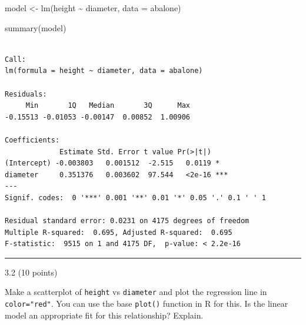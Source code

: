 \documentclass[
  letterpaper,
  DIV=11,
  numbers=noendperiod]{scrartcl}
\newenvironment{Shaded}{\begin{snugshade}}{\end{snugshade}}
\newcommand{\AttributeTok}[1]{\textcolor[rgb]{0.40,0.45,0.13}{#1}}
\newcommand{\FunctionTok}[1]{\textcolor[rgb]{0.28,0.35,0.67}{#1}}
\newcommand{\NormalTok}[1]{\textcolor[rgb]{0.00,0.23,0.31}{#1}}
\newcommand{\OtherTok}[1]{\textcolor[rgb]{0.00,0.23,0.31}{#1}}
\newcommand{\SpecialCharTok}[1]{\textcolor[rgb]{0.37,0.37,0.37}{#1}}
\newcommand{\StringTok}[1]{\textcolor[rgb]{0.13,0.47,0.30}{#1}}
\begin{document}
\begin{Shaded}
\begin{Highlighting}[]
\NormalTok{model }\OtherTok{\textless{}{-}} \FunctionTok{lm}\NormalTok{(height }\SpecialCharTok{\textasciitilde{}}\NormalTok{ diameter, }\AttributeTok{data =}\NormalTok{ abalone)}

\FunctionTok{summary}\NormalTok{(model)}
\end{Highlighting}
\end{Shaded}

\begin{verbatim}

Call:
lm(formula = height ~ diameter, data = abalone)

Residuals:
     Min       1Q   Median       3Q      Max 
-0.15513 -0.01053 -0.00147  0.00852  1.00906 

Coefficients:
             Estimate Std. Error t value Pr(>|t|)    
(Intercept) -0.003803   0.001512  -2.515   0.0119 *  
diameter     0.351376   0.003602  97.544   <2e-16 ***
---
Signif. codes:  0 '***' 0.001 '**' 0.01 '*' 0.05 '.' 0.1 ' ' 1

Residual standard error: 0.0231 on 4175 degrees of freedom
Multiple R-squared:  0.695, Adjusted R-squared:  0.695 
F-statistic:  9515 on 1 and 4175 DF,  p-value: < 2.2e-16
\end{verbatim}

\begin{center}\rule{0.5\linewidth}{0.5pt}\end{center}

3.2 (10 points)

Make a scatterplot of \texttt{height} vs \texttt{diameter} and plot the
regression line in \texttt{color="red"}. You can use the base
\texttt{plot()} function in R for this. Is the linear model an
appropriate fit for this relationship? Explain.

\begin{Shaded}
\end{Shaded}
\end{document}
